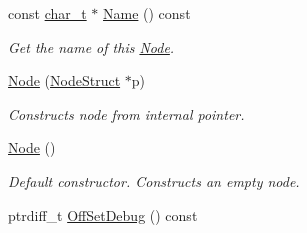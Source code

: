 \begin{DoxyCompactItemize}
const \hyperlink{namespacephys_1_1xml_afc87705cd1c2917d87b879715a2d8f6e}{char\_\-t} $\ast$ \hyperlink{classphys_1_1xml_1_1Node_a53facd97d76240a3f3fffc86caacdc24}{Name} () const 
\begin{DoxyCompactList}\small\item\em Get the name of this \hyperlink{classphys_1_1xml_1_1Node}{Node}. \item\end{DoxyCompactList}\item 
\hyperlink{classphys_1_1xml_1_1Node_aaefbe98a05a7bf304612c3e7f7556f42}{Node} (\hyperlink{classNodeStruct}{NodeStruct} $\ast$p)
\begin{DoxyCompactList}\small\item\em Constructs node from internal pointer. \item\end{DoxyCompactList}\item 
\hypertarget{classphys_1_1xml_1_1Node_a82203e57f13363aee523feb696f64bb9}{
\hyperlink{classphys_1_1xml_1_1Node_a82203e57f13363aee523feb696f64bb9}{Node} ()}
\label{classphys_1_1xml_1_1Node_a82203e57f13363aee523feb696f64bb9}

\begin{DoxyCompactList}\small\item\em Default constructor. Constructs an empty node. \item\end{DoxyCompactList}\item 
\hypertarget{classphys_1_1xml_1_1Node_add5c56d3e9bef050c774b9aa97240e98}{
ptrdiff\_\-t \hyperlink{classphys_1_1xml_1_1Node_add5c56d3e9bef050c774b9aa97240e98}{OffSetDebug} () const }
\label{classphys_1_1xml_1_1Node_add5c56d3e9bef050c774b9aa97240e98}


\end{DoxyCompactItemize}

